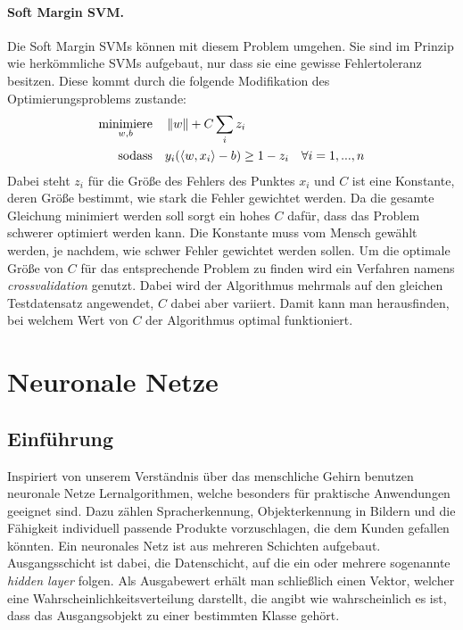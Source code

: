 \paragraph{Soft Margin SVM.}
Die Soft Margin SVMs können mit diesem Problem umgehen.
Sie sind im Prinzip wie herkömmliche SVMs aufgebaut, nur dass sie eine gewisse Fehlertoleranz besitzen. Diese kommt durch die folgende Modifikation des Optimierungsproblems zustande:
\begin{align*}
	\underset{w,b}{\operatorname{minimiere}} \quad & \left\lVert w\right\rVert + C\sum_{i}{z_{i}} \\
	\operatorname{sodass} \quad & y_{i}(\langle w,x_{i} \rangle - b) \geq 1 - z_{i} \quad \forall i = 1,...,n
\end{align*}
Dabei steht $z_{i}$ für die Grö\ss e des Fehlers des Punktes $x_{i}$ und $C$ ist eine Konstante, deren Grö\ss e bestimmt, wie stark die Fehler gewichtet werden. Da die gesamte Gleichung minimiert werden soll sorgt ein hohes $C$ dafür, dass das Problem schwerer optimiert werden kann. Die Konstante muss vom Mensch gewählt werden, je nachdem, wie schwer Fehler gewichtet werden sollen.
Um die optimale Größe von $C$ für das entsprechende Problem zu finden wird ein Verfahren namens \emph{crossvalidation} genutzt. Dabei wird der Algorithmus mehrmals auf den gleichen Testdatensatz angewendet, $C$ dabei aber variiert. Damit kann man herausfinden, bei welchem Wert von $C$ der Algorithmus optimal funktioniert.


\section{Neuronale Netze}
\author {Farhadiba Mohammed}

\subsection{Einführung}

Inspiriert von unserem Verständnis über das menschliche Gehirn benutzen neuronale Netze Lernalgorithmen, welche besonders für praktische Anwendungen geeignet sind.
Dazu zählen Spracherkennung, Objekterkennung in Bildern und die Fähigkeit individuell passende Produkte vorzuschlagen, die dem Kunden gefallen könnten. 
Ein neuronales Netz ist aus mehreren Schichten aufgebaut. Ausgangsschicht ist dabei, die Datenschicht, auf die ein oder mehrere sogenannte \emph{hidden layer} folgen. Als Ausgabewert erhält man schließlich einen Vektor, welcher eine Wahrscheinlichkeitsverteilung darstellt, die angibt wie wahrscheinlich es ist, dass das Ausgangsobjekt zu einer bestimmten Klasse gehört.

